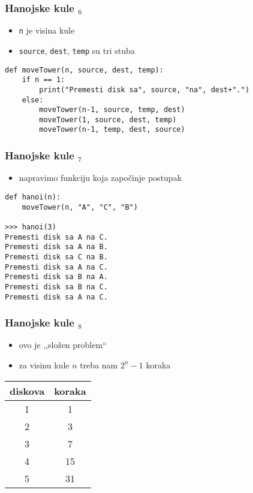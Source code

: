 \documentclass[utf8,compress,aspectratio=169]{beamer}
\begin{document}
\begin{frame}[fragile]
  \frametitle{Hanojske kule $_6$}
  \begin{itemize}
    \item \texttt{n} je visina kule
    \item \texttt{source}, \texttt{dest}, \texttt{temp} su tri stuba
  \end{itemize}
\begin{verbatim}
def moveTower(n, source, dest, temp):
    if n == 1:
        print("Premesti disk sa", source, "na", dest+".")
    else:
        moveTower(n-1, source, temp, dest)
        moveTower(1, source, dest, temp)
        moveTower(n-1, temp, dest, source)
\end{verbatim}
\end{frame}

\begin{frame}[fragile]
  \frametitle{Hanojske kule $_7$}
  \begin{itemize}
    \item napravimo funkciju koja započinje postupak
  \end{itemize}
\begin{verbatim}
def hanoi(n):
    moveTower(n, "A", "C", "B")

>>> hanoi(3)
Premesti disk sa A na C.
Premesti disk sa A na B.
Premesti disk sa C na B.
Premesti disk sa A na C.
Premesti disk sa B na A.
Premesti disk sa B na C.
Premesti disk sa A na C.
\end{verbatim}
\end{frame}

\begin{frame}[fragile]
  \frametitle{Hanojske kule $_8$}
  \begin{itemize}
    \item ovo je ,,složen problem``
    \item za visinu kule $n$ treba nam $2^n-1$ koraka
  \end{itemize}
\begin{center}
\begin{tabular}{cc}
\textbf{diskova} & \textbf{koraka} \\ \hline
1 & 1 \\
2 & 3 \\
3 & 7 \\
4 & 15 \\
5 & 31
\end{tabular}
\end{center}
\end{frame}
\end{document}
